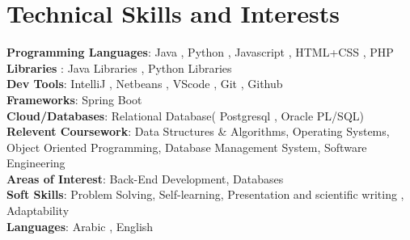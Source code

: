 \documentclass[a4paper,11pt]{article}
\makeatletter
\newcommand{\resumePOR}[3]{
\vspace{0.5mm}\item
    \begin{tabular*}{0.97\textwidth}[t]{l@{\extracolsep{\fill}}r}
        \textbf{#1}\hspace{0.3mm}#2 & \textit{\small{#3}} 
    \end{tabular*}
    \vspace{-2mm}
}
\newcommand{\resumeSubHeadingListStart}{\begin{itemize}[leftmargin=*,labelsep=0mm]}
\newcommand{\resumeItemListStart}{\begin{justify}\begin{itemize}[leftmargin=3ex, rightmargin=2ex, noitemsep,labelsep=1.2mm,itemsep=0mm]\small}
\newcommand{\resumeSubHeadingListEnd}{\end{itemize}\vspace{2mm}}
\newcommand{\resumeItemListEnd}{\end{itemize}\end{justify}\vspace{-2mm}}
\makeatother
\begin{document}







\section{\textbf{Technical Skills and Interests}}
 \begin{itemize}[leftmargin=0.05in, label={}]
    \small{\item{
     \textbf{Programming Languages}{: Java , Python , Javascript , HTML+CSS , PHP} \\
     \textbf{Libraries }{: Java Libraries , Python Libraries}\\ 
     \textbf{Dev Tools}{: IntelliJ , Netbeans , VScode , Git , Github } \\ 
     \textbf{Frameworks}{: Spring Boot } \\
     \textbf{Cloud/Databases}{: Relational Database( Postgresql , Oracle PL/SQL) } \\  
     
     \textbf{Relevent Coursework}{: Data Structures \& Algorithms, Operating Systems, Object Oriented Programming, Database Management System, Software Engineering} \\ 
     \textbf{Areas of Interest}{: Back-End Development, Databases} \\
     \textbf{Soft Skills}{: Problem Solving, Self-learning, Presentation and scientific writing , Adaptability} \\
     \textbf{Languages}{: Arabic , English} \\
    }}
 \end{itemize}
 \vspace{-16pt}



\end{document}
